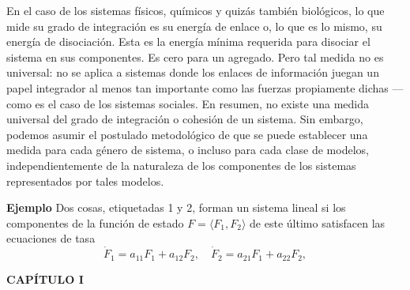 {En el caso de los sistemas físicos, químicos y quizás también biológicos, lo que mide su grado de integración es su energía de enlace o, lo que es lo mismo, su energía de disociación. Esta es la energía mínima requerida para disociar el sistema en sus componentes. Es cero para un agregado. Pero tal medida no es universal: no se aplica a sistemas donde los enlaces de información juegan un papel integrador al menos tan importante como las fuerzas propiamente dichas —como es el caso de los sistemas sociales. En resumen, no existe una medida universal del grado de integración o cohesión de un sistema. Sin embargo, podemos asumir el postulado metodológico de que se puede establecer una medida para cada género de sistema, o incluso para cada clase de modelos, independientemente de la naturaleza de los componentes de los sistemas representados por tales modelos.

\textbf{Ejemplo} Dos cosas, etiquetadas 1 y 2, forman un sistema lineal si los componentes de la función de estado \( F = \langle F_1, F_2 \rangle \) de este último satisfacen las ecuaciones de tasa
\[\dot{F}_1 = a_{11}F_1 + a_{12}F_2, \quad \dot{F}_2 = a_{21}F_1 + a_{22}F_2,\]
}

\newpage
\fancyhf{}
\fancyhead[l]{\thepage}
\begin{center}
{\fontsize{13}{16}\selectfont \textbf{CAPÍTULO I}}
\end{center}
\vspace{0.5cm}

